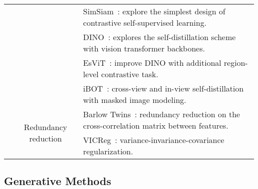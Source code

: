 \documentclass[lettersize,journal]{IEEEtran}
\begin{document}
\begin{table*}
\begin{tabular}{|c|c|l|}
                                                  &                                         & SimSiam~\cite{chen2021exploring}: explore the simplest design of contrastive self-supervised learning.            \\
                                                  &                                         & DINO~\cite{caron2021emerging}: explores the self-distillation scheme with vision transformer backbones.           \\
                                                  &                                         & EsViT~\cite{li2021efficient}: improve DINO with additional region-level contrastive task.                         \\
                                                  &                                         & iBOT~\cite{zhou2021ibot}: cross-view and in-view self-distillation with masked image modeling.                      \\ \cline{2-3} 
                                                  & \multirow{2}{*}{Redundancy reduction}   & Barlow Twins~\cite{zbontar2021barlow}: redundancy reduction on the cross-correlation matrix between features.      \\
                                                  &                                         & VICReg~\cite{bardes2021vicreg}: variance-invariance-covariance regularization.                                    \\ \hline
\end{tabular}

\label{tab:ssl}
\end{table*}


\subsection{Generative Methods}
\label{sec:GenerativeMethods}
\end{document}
